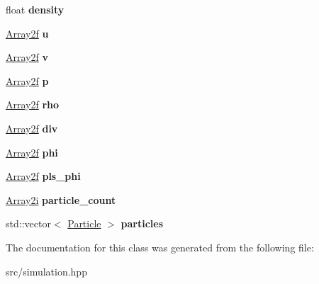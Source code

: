 \begin{DoxyCompactItemize}
\item 
\mbox{\label{classFluid_a37d21500ee569e487b5d51f744804dab}} 
float {\bfseries density}
\item 
\mbox{\label{classFluid_a18a14a29f0d97098abaee80e3a72ddc3}} 
\mbox{\hyperlink{structArray2}{Array2f}} {\bfseries u}
\item 
\mbox{\label{classFluid_a376539eee2e601d130fd4a3878e369c0}} 
\mbox{\hyperlink{structArray2}{Array2f}} {\bfseries v}
\item 
\mbox{\label{classFluid_aa272eaa20fce83ec28a5128f6da36bce}} 
\mbox{\hyperlink{structArray2}{Array2f}} {\bfseries p}
\item 
\mbox{\label{classFluid_a5be81c0080ee104a569a36ec05396055}} 
\mbox{\hyperlink{structArray2}{Array2f}} {\bfseries rho}
\item 
\mbox{\label{classFluid_a286368211bb33e944a81b40f017e097d}} 
\mbox{\hyperlink{structArray2}{Array2f}} {\bfseries div}
\item 
\mbox{\label{classFluid_a7f30bffe319c5510cadc0e6a0bf9e46b}} 
\mbox{\hyperlink{structArray2}{Array2f}} {\bfseries phi}
\item 
\mbox{\label{classFluid_a150374b15e3316868e4e25adab3d8c36}} 
\mbox{\hyperlink{structArray2}{Array2f}} {\bfseries pls\+\_\+phi}
\item 
\mbox{\label{classFluid_ad92688aa96d6ed341a72cc7f5767f807}} 
\mbox{\hyperlink{structArray2}{Array2i}} {\bfseries particle\+\_\+count}
\item 
\mbox{\label{classFluid_a7396528e73ff44f0dcba486205c9b083}} 
std\+::vector$<$ \mbox{\hyperlink{classParticle}{Particle}} $>$ {\bfseries particles}
\end{DoxyCompactItemize}


The documentation for this class was generated from the following file\+:\begin{DoxyCompactItemize}
\item 
src/simulation.\+hpp\end{DoxyCompactItemize}
